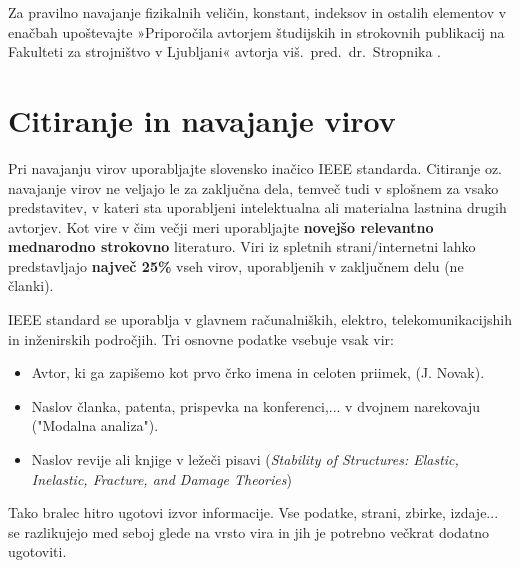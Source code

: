 Za pravilno navajanje fizikalnih veličin, konstant, indeksov in ostalih 
elementov v enačbah upoštevajte »Priporočila avtorjem študijskih in strokovnih 
publikacij na Fakulteti za strojništvo v Ljubljani« avtorja 
viš.~pred.~dr.~Stropnika \cite{stropnik_1997}.

\section{Citiranje in navajanje virov}\label{sec:citiranje}

Pri navajanju virov uporabljajte slovensko inačico IEEE standarda. Citiranje 
oz. navajanje virov ne veljajo le za zaključna dela, temveč tudi v splošnem za 
vsako predstavitev, v kateri sta uporabljeni intelektualna ali materialna 
lastnina drugih avtorjev. Kot vire v čim večji meri uporabljajte 
\textbf{novejšo relevantno mednarodno strokovno} literaturo. Viri iz spletnih 
strani/internetni lahko predstavljajo \textbf{največ 25\%} vseh virov, 
uporabljenih v zaključnem delu (ne članki).

IEEE standard se uporablja v glavnem računalniških, elektro, 
telekomunikacijshih in inženirskih področjih. Tri osnovne podatke vsebuje vsak 
vir:
\begin{itemize}
	\item Avtor, ki ga zapišemo kot prvo črko imena in celoten priimek, (J. 
	Novak).
	\item Naslov članka, patenta, prispevka na konferenci,...  v dvojnem 
	narekovaju ("Modalna analiza").
	\item Naslov revije ali knjige v ležeči pisavi (\emph{Stability of 
		Structures: Elastic, Inelastic, Fracture, and Damage Theories})
\end{itemize}
Tako bralec hitro ugotovi izvor informacije. Vse podatke, strani, zbirke, 
izdaje...  se razlikujejo med seboj glede na vrsto vira in jih je potrebno 
večkrat dodatno ugotoviti. 

